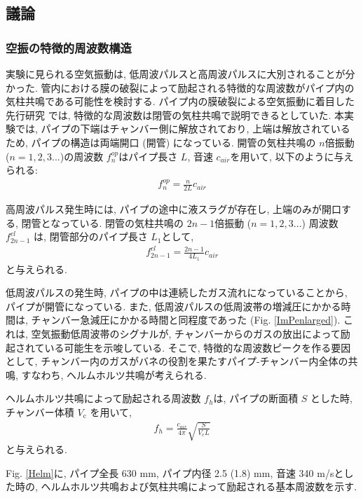 \documentclass[12pt]{article}
\begin{document}
\clearpage
\subsection{議論}\label{ACOdisc}


\subsubsection{空振の特徴的周波数構造}
実験に見られる空気振動は, 低周波パルスと高周波パルスに大別されることが分かった. 管内における膜の破裂によって励起される特徴的な周波数がパイプ内の気柱共鳴である可能性を検討する. パイプ内の膜破裂による空気振動に着目した先行研究 \citep{Vidal2006a, Sanchez2014} では, 特徴的な周波数は閉管の気柱共鳴で説明できるとしていた. 本実験では, パイプの下端はチャンバー側に解放されており, 上端は解放されているため, パイプの構造は両端開口 (開管) になっている. 開管の気柱共鳴の $n$倍振動 ($n=1,2,3...$)の周波数 $f^{op}_{n}$はパイプ長さ $L$, 音速 $c_{air}$を用いて, 以下のように与えられる:
\begin{eqnarray}
f^{op}_{n}=\frac{n}{2L} c_{air}
\end{eqnarray}

高周波パルス発生時には, パイプの途中に液スラグが存在し, 上端のみが開口する, 閉管となっている. 閉管の気柱共鳴の $2n-1$倍振動 ($n=1,2,3...$) 周波数 $f^{cl}_{2n-1}$ は, 閉管部分のパイプ長さ $L_1$として, 
\begin{eqnarray}
f^{cl}_{2n-1}=\frac{2n-1}{4L_1} c_{air}
\end{eqnarray}
と与えられる.

低周波パルスの発生時, パイプの中は連続したガス流れになっていることから, パイプが開管になっている.  また, 低周波パルスの低周波帯の増減圧にかかる時間は, チャンバー急減圧にかかる時間と同程度であった (Fig. \ref{ImPenlarged}). これは, 空気振動低周波帯のシグナルが, チャンバーからのガスの放出によって励起されている可能生を示唆している. そこで, 特徴的な周波数ピークを作る要因として, チャンバー内のガスがバネの役割を果たすパイプ-チャンバー内全体の共鳴, すなわち, ヘルムホルツ共鳴が考えられる.

ヘルムホルツ共鳴によって励起される周波数 $f_h$は, パイプの断面積 $S$ とした時, チャンバー体積 $V_\mathrm{c}$ を用いて,  
\begin{eqnarray}
f_{h}=\frac{c_{air}}{4\pi} \sqrt{  \frac{S}{V_\mathrm{c} L }   } \label{Helmeq}
\end{eqnarray}
と与えられる. 

Fig. \ref{Helm}に, パイプ全長 630 mm, パイプ内径 2.5 (1.8) mm, 音速 340 m/sとした時の, ヘルムホルツ共鳴および気柱共鳴によって励起される基本周波数を示す. 
\end{document}
